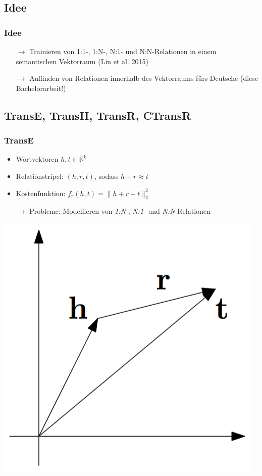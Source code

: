 \documentclass[10pt,xcolor={usenames,dvipsnames,svgnames,table}]{beamer}
\begin{document}
\begin{frame}
	\section{Idee}
	\frametitle{Idee}
	\begin{itemize}
		\item[$\rightarrow$] Trainieren von 1:1-, 1:N-, N:1- und N:N-Relationen in einem semantischen Vektorraum (Lin et al. 2015)
		\item[$\rightarrow$] Auffinden von Relationen innerhalb des Vektorraums fürs Deutsche (diese Bachelorarbeit!)
	\end{itemize}
\end{frame}

\begin{frame}
	\section{TransE, TransH, TransR, CTransR}
	\frametitle{TransE}
	\begin{itemize}
		\item Wortvektoren $h, t \in \mathbb{R}^k$
		\item Relationstripel: $(h, r, t)$, sodass $h + r \approx t$
		\item Kostenfunktion: $f_r(h, t) = \|h + r - t\|^2_2$
		\item[$\rightarrow$] Probleme: Modellieren von \emph{1:N}-, \emph{N:1}- und \emph{N:N}-Relationen
	\end{itemize}
	\begin{center}
		\includegraphics[scale=0.20]{./img/transe.png}
	\end{center}
\end{frame}
\end{document}

